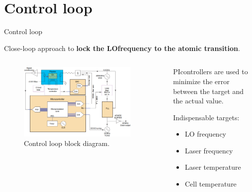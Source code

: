 \section{Control loop}

\begin{frame}{Control loop}

    Close-loop approach to \textbf{lock the LO\footnotemark[1] frequency to the atomic transition}.

    \vspace{10pt}

    \begin{columns}[c, onlytextwidth]

        \begin{column}{0.6\textwidth}

            \begin{figure}
                \centering
                \includegraphics[width=0.9\textwidth]{img/control-loop.png}
                \caption{Control loop block diagram.}
            \end{figure}

        \end{column}

        \begin{column}{0.4\textwidth}

            PI\footnotemark[2] controllers are used to minimize the error between the target and the actual value.

            \vspace{10pt}

            Indispensable targets:

            \begin{itemize}
                \item LO frequency
                \item Laser frequency
                \item Laser temperature
                \item Cell temperature
            \end{itemize}


\end{column}
\end{columns}
\end{frame}
